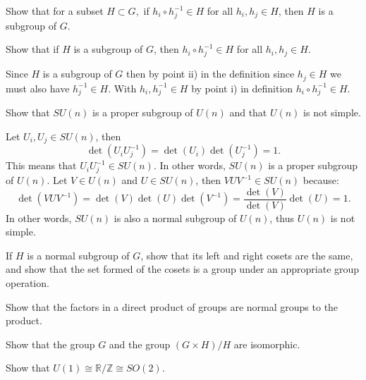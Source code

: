 \documentclass[notes.tex]{subfiles}
\begin{document}
\begin{Exercise}[]
Show that for a subset $H\subset G,$ if $h_i \circ h_j^{-1} \in H$ for all $h_i, h_j\in H$, then $H$ is a subgroup of $G$.
\end{Exercise}
\begin{Answer}
\end{Answer}

\begin{Exercise}[]
Show that if $H$ is a subgroup of $G$, then $h_i \circ h_j^{-1} \in H$ for all $h_i, h_j\in H$.
\end{Exercise}
\begin{Answer}
Since $H$ is a subgroup of $G$ then by point ii) in the definition since $h_j\in H$ we must also have $h_j^{-1} \in H$. With $h_i, h_j^{-1} \in H$ by point i) in definition $h_i  \circ h_j^{-1} \in H$.
\end{Answer}

\begin{Exercise}[label=ex:SUn_normal]
Show that $SU(n)$ is a proper subgroup of $U(n)$ and that $U(n)$ is not simple.
\end{Exercise}

\begin{Answer}
Let $U_i, U_j \in SU(n)$, then 
\[\det(U_i U_j^{-1}) = \det(U_i)\det(U_j^{-1}) = 1.\]
This means that $U_i U^{-1}_j \in SU(n)$. In other words, $SU(n)$ is a proper subgroup of $U(n)$. Let $V \in U(n)$ and $U \in SU(n)$, then $VUV^{-1} \in SU(n)$ because:
\[\det(VUV^{-1}) = \det(V)\det(U)\det(V^{-1}) = \frac{\det(V)}{\det(V)} \det(U) = 1.\]
In other words, $SU(n)$ is also a normal subgroup of $U(n)$, thus $U(n)$ is not simple.
\end{Answer}

\begin{Exercise}[]
If $H$ is a normal subgroup of $G$, show that its left and right cosets are the same, and show that the set formed of the cosets is a group under an appropriate group operation.
\end{Exercise}

\begin{Exercise}[]
Show that the factors in a direct product of groups are normal groups to the product.
\end{Exercise}

\begin{Exercise}[]
Show that the group $G$ and the group $(G\times H) / H$ are isomorphic.
\end{Exercise}


\begin{Exercise}[]
Show that $U(1)\cong\mathbb{R}/\mathbb{Z}\cong SO(2)$.
\end{Exercise}
\end{document}
